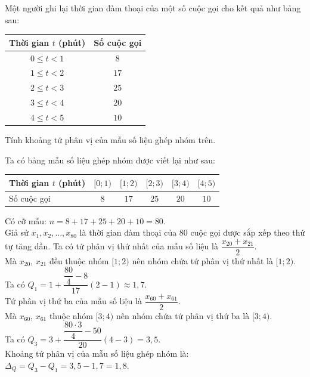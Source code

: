 \begin{bt}%
	Một người ghi lại thời gian đàm thoại của một số cuộc gọi cho kết quả như bảng sau:
	\begin{center}
		\begin{tabular}{|c|c|}
			\hline Thời gian $t$ (phút) & Số cuộc gọi \\
			\hline $0 \leq t<1$ & $8$ \\
			\hline $1 \leq t<2$ & $17$ \\
			\hline $2 \leq t<3$ & $25$ \\
			\hline $3 \leq t<4$ & $20$ \\
			\hline $4 \leq t<5$ & $10$ \\
			\hline
		\end{tabular}
	\end{center}
	Tính khoảng tứ phân vị của mẫu số liệu ghép nhóm trên.
	\loigiai
	{
		Ta có bảng mẫu số liệu ghép nhóm được viết lại như sau:
		\begin{center}
			\begin{tabular}{|l|c|c|c|c|c|}
				\hline 
				Thời gian $t$ (phút) & $[0 ; 1)$ & $[1 ; 2)$ & $[2 ; 3)$ & $[3 ; 4)$ & $[4 ; 5)$ \\
				\hline 
				Số cuộc gọi & $8$ & $17$ & $25$ & $20$ & $10$ \\
				\hline
			\end{tabular}
		\end{center}
		Có cỡ mẫu: $n=8+17+25+20+10=80$.\\
		Giả sử $x_1, x_2, \ldots, x_{80}$ là thời gian đàm thoại của $80$ cuộc gọi được sắp xếp theo thứ tự tăng dần. Ta có tứ phân vị thứ nhất của mẫu số liệu là $\dfrac{x_{20}+x_{21}}{2}$.\\
		Mà $x_{20}$, $x_{21}$ đều thuộc nhóm $[1;2)$ nên nhóm chứa tứ phân vị thứ nhất là $[1;2)$.\\
		Ta có $Q_1=1+\dfrac{\dfrac{80}{4}-8}{17}(2-1) \approx 1{,}7$.\\
		Tứ phân vị thứ ba của mẫu số liệu là $\dfrac{x_{60}+x_{61}}{2}$.\\
		Mà $x_{60}$, $x_{61}$ thuộc nhóm $[3;4)$ nên nhóm chứa tứ phân vị thứ ba là $[3;4)$.\\
		Ta có $Q_3=3+\dfrac{\dfrac{80\cdot 3}{4}-50}{20}(4-3)=3{,}5$.\\
		Khoảng tứ phân vị của mẫu số liệu ghép nhóm là: $\Delta_Q=Q_3-Q_1=3{,}5-1{,}7=1{,}8$.
	}
\end{bt}

